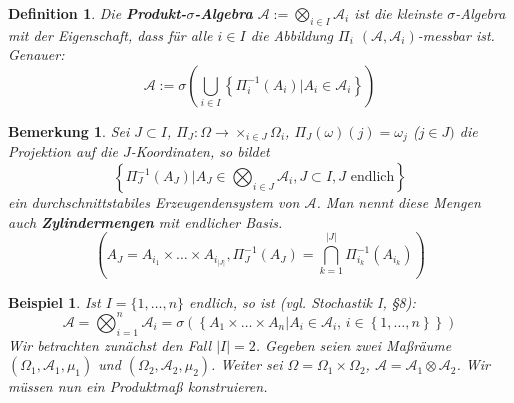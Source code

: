 \documentclass[a4paper,11pt]{scrbook}
\def\AA{ \mathcal{A} }
\newtheorem*{DefON}{Definition}
\newtheorem{Bsp}{Beispiel}[chapter]
\newtheorem*{BemON}{Bemerkung}
\theoremstyle{nonumberplain}
\begin{document}
\begin{DefON} Die \textbf{Produkt-$\sigma$-Algebra} $\AA:=\bigotimes_{i\in I}\AA_i$ ist die kleinste $\sigma$-Algebra mit der Eigenschaft, dass für alle $i\in I$ die Abbildung $\Pi_i$ $(\AA,\AA_i)$-messbar ist. Genauer: \\
\begin{displaymath}
\AA := \sigma \left( \bigcup_{i\in I} \left\{ \Pi^{-1}_i(A_i) | A_i \in \AA_i\right\}\right)
\end{displaymath}
\end{DefON}

\begin{BemON} Sei $J\subset I$, $\Pi_J:\Omega\to\times_{i\in J}\Omega_i$, $\Pi_J(\omega)(j)=\omega_j$ ($j\in J)$ die Projektion auf die $J$-Koordinaten, so bildet \\
\begin{displaymath}
\left\{\Pi_J^{-1}\left(A_J\right) | A_J \in \bigotimes_{i\in J} \AA_i, J\subset I, J\text{ endlich}\right\}
\end{displaymath}
ein durchschnittstabiles Erzeugendensystem von $\AA$. Man nennt diese Mengen auch \textbf{Zylindermengen} mit endlicher Basis.
\begin{displaymath}
\left( A_J=A_{i_1}\times\dots\times A_{i_{|J|}}, \Pi_J^{-1}\left( A_J\right)=\bigcap_{k=1}^{|J|}\Pi_{i_k}^{-1}\left( A_{i_k}\right)\right)
\end{displaymath}
\end{BemON}

\begin{Bsp} \label{Bsp3.1} Ist $I=\{1,\dots,n\}$ endlich, so ist (vgl. Stochastik I, §8): \\
\begin{displaymath}
\AA=\bigotimes_{i=1}^n\AA_i=\sigma\left(\left\{A_1\times\dots\times A_n | A_i\in\AA_i\text{, }i\in\left\{1,\dots,n\right\}\right\}\right)
\end{displaymath}
Wir betrachten zunächst den Fall $|I|=2$. Gegeben seien zwei Maßräume $(\Omega_1,\AA_1,\mu_1)$ und $(\Omega_2,\AA_2,\mu_2)$. Weiter sei $\Omega=\Omega_1\times\Omega_2$, $\AA=\AA_1\otimes\AA_2$. Wir müssen nun ein Produktmaß konstruieren.
\end{Bsp}
\end{document}
